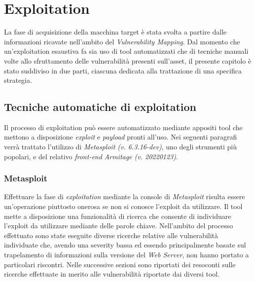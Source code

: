 
\chapter{Exploitation}
La fase di acquisizione della macchina target è stata svolta a partire dalle informazioni ricavate nell'ambito del \emph{Vulnerability Mapping}. Dal momento che un'exploitation esaustiva fa sia uso di tool automatizzati che di tecniche manuali volte allo sfruttamento delle vulnerabilità presenti sull'asset, il presente capitolo è stato suddiviso in due parti, ciascuna dedicata alla trattazione di una specifica strategia.
\section{Tecniche automatiche di exploitation}
Il processo di exploitation può essere automatizzato mediante appositi tool che mettono a disposizione \emph{exploit} e \emph{payload} pronti all'uso. Nei seguenti paragrafi verrà trattato l'utilizzo di \emph{Metasploit (v. 6.3.16-dev)}, uno degli strumenti più popolari, e del relativo \emph{front-end} \emph{Armitage (v. 20220123)}. 
\subsection{Metasploit}
Effettuare la fase di \emph{exploitation} mediante la console di \emph{Metasploit} risulta essere un'operazione piuttosto onerosa se non si conosce l'exploit da utilizzare. Il tool mette a disposizione una funzionalità di ricerca che consente di individuare l'exploit da utilizzare mediante delle parole chiave. Nell'ambito del processo effettuato sono state eseguite diverse ricerche relative alle vulnerabilità individuate che, avendo una severity bassa ed essendo principalmente basate sul trapelamento di informazioni sulla versione del \emph{Web Server}, non hanno portato a particolari riscontri. Nelle successive sezioni sono riportati dei resoconti sulle ricerche effettuate in merito alle vulnerabilità riportate dai diversi tool.
